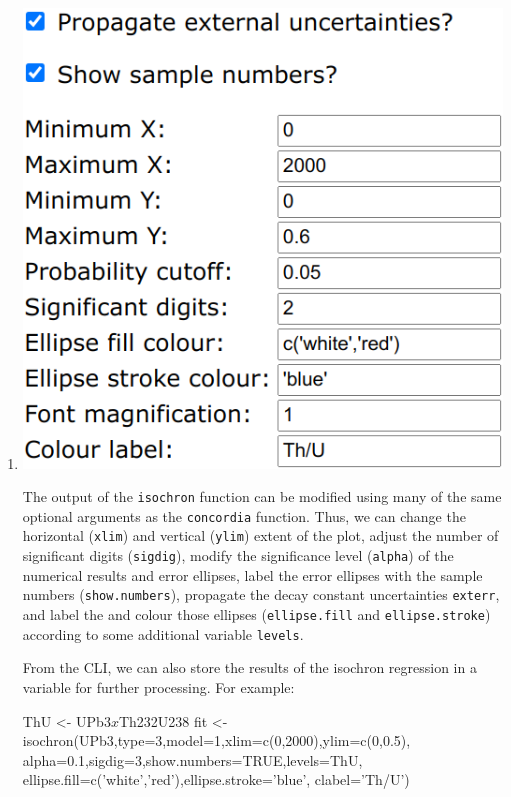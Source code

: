 \begin{refsection}
\begin{enumerate}
\item \noindent\begin{minipage}[t]{.4\linewidth}
  \strut\vspace*{-\baselineskip}\newline
  \includegraphics[width=\linewidth]{../figures/UPbIsochronExtraOptions.png}\\
\end{minipage}
  \begin{minipage}[t]{.6\linewidth}
    The output of the \texttt{isochron} function can be modified using
    many of the same optional arguments as the \texttt{concordia}
    function.  Thus, we can change the horizontal (\texttt{xlim}) and
    vertical (\texttt{ylim}) extent of the plot, adjust the number of
    significant digits (\texttt{sigdig}), modify the significance
    level (\texttt{alpha}) of the numerical results and error
    ellipses, label the error ellipses with the sample numbers
    (\texttt{show.numbers}), propagate the decay constant
    uncertainties \texttt{exterr}, and label the and colour those
    ellipses (\texttt{ellipse.fill} and \texttt{ellipse.stroke})
    according to some additional variable \texttt{levels}.
\end{minipage}
From the CLI, we can also store the results of the isochron regression
in a variable for further processing. For example:
\begin{script}
ThU <- UPb3$x$Th232U238
fit <- isochron(UPb3,type=3,model=1,xlim=c(0,2000),ylim=c(0,0.5),
                alpha=0.1,sigdig=3,show.numbers=TRUE,levels=ThU,
                ellipse.fill=c('white','red'),ellipse.stroke='blue',
                clabel='Th/U')
\end{script}


\end{enumerate}
\end{refsection}
